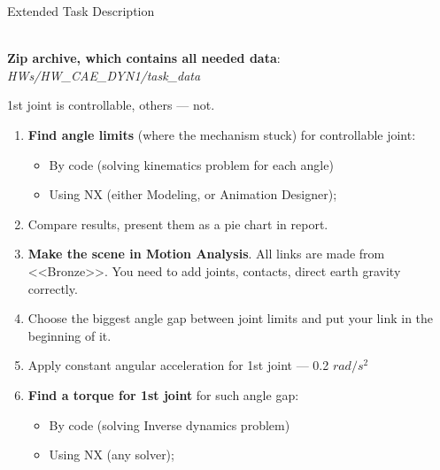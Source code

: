 \documentclass[aspectratio=169]{beamer}
\begin{document}
\begin{frame}[t]{Extended Task Description}
\framesubtitle{}
\vspace{-0.6cm}
    \begin{columns}[T,onlytextwidth]
        \begin{column}{0.59\textwidth}
            \scriptsize
    \textbf{Zip archive, which contains all needed data}: \textit{HWs/HW\_CAE\_DYN1/task\_data}
    
    1st joint is controllable, others --- not.
    \vspace{-0.1cm}
    \begin{enumerate}
        \item \textbf{Find angle limits} (where the mechanism stuck) for controllable joint:
        \vspace{-0.45cm}

        \begin{itemize}
            \scriptsize
            \item By code (solving kinematics problem for each angle)
            \item Using NX (either Modeling, or Animation Designer);
        \end{itemize}
        \vspace{-0.2cm}

        \item Compare results, present them as a pie chart in report.
        \item \textbf{Make the scene in Motion Analysis}. All links are made from <<Bronze>>. You need to add joints, contacts, direct earth gravity correctly.
        \item Choose the biggest angle gap between joint limits and put your link in the beginning of it.
        \item Apply constant angular acceleration for 1st joint --- 0.2 $rad / s^2$
        \item \textbf{Find a torque for 1st joint} for such angle gap:
        \vspace{-0.1cm}

        \begin{itemize}
            \scriptsize
            \item By code (solving Inverse dynamics problem)
            \item Using NX (any solver);
        \end{itemize}
        \vspace{-0.2cm}


\end{enumerate}
\end{column}
\end{columns}
\end{frame}
\end{document}
